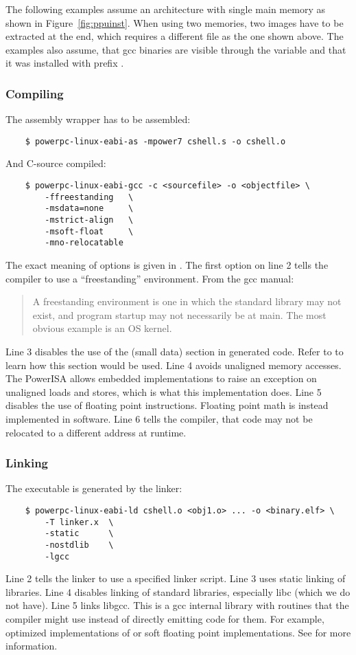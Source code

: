 The following examples assume an architecture with single main memory as shown in Figure~\ref{fig:ppuinst}.
When using two memories, two images have to be extracted at the end, which requires a different  file as the one shown above.
The examples also assume, that gcc binaries are visible through the  variable and that it was installed with prefix .


\subsubsection{Compiling}

The assembly wrapper has to be assembled:
\begin{lstlisting}
    $ powerpc-linux-eabi-as -mpower7 cshell.s -o cshell.o
\end{lstlisting}
And C-source compiled:
\begin{lstlisting}
    $ powerpc-linux-eabi-gcc -c <sourcefile> -o <objectfile> \
        -ffreestanding   \
        -msdata=none     \
        -mstrict-align   \
        -msoft-float     \
        -mno-relocatable
\end{lstlisting}
The exact meaning of options is given in \cite{gccmanual}.
The first option on line 2 tells the compiler to use a ``freestanding'' environment.
From the gcc manual:
\begin{quote}
   A freestanding environment is one in which the standard library may not exist, and program startup may not necessarily be at main.
   The most obvious example is an OS kernel. 
\end{quote}
Line 3 disables the use of the  (small data) section in generated code.
Refer to \cite{IBM1998} to learn how this section would be used.
Line 4 avoids unaligned memory accesses.
The PowerISA allows embedded implementations to raise an exception on unaligned loads and stores, which is what this implementation does.
Line 5 disables the use of floating point instructions.
Floating point math is instead implemented in software.
Line 6 tells the compiler, that code may not be relocated to a different address at runtime.


\subsubsection{Linking}

The executable is generated by the linker:
\begin{lstlisting}
    $ powerpc-linux-eabi-ld cshell.o <obj1.o> ... -o <binary.elf> \
        -T linker.x  \
        -static      \
        -nostdlib    \
        -lgcc
\end{lstlisting}
Line 2 tells the linker to use a specified linker script.
Line 3 uses static linking of libraries.
Line 4 disables linking of standard libraries, especially libc (which we do not have).
Line 5 links libgcc.
This is a gcc internal library with routines that the compiler might use instead of directly emitting code for them.
For example, optimized implementations of  or soft floating point implementations.
See \cite{libgcc} for more information.


